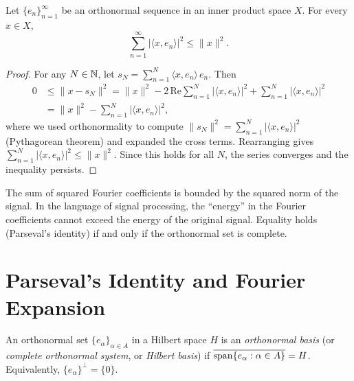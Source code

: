 \documentclass[11pt,a4paper]{article}
\begin{document}
\begin{theorem}
\label{thm:bessel}
Let $\{e_n\}_{n=1}^\infty$ be an orthonormal sequence in an inner
product space $X$. For every $x \in X$,
\[
    \sum_{n=1}^\infty |\langle x, e_n \rangle|^2 \leq \|x\|^2.
\]
\end{theorem}

\begin{proof}
For any $N \in \mathbb{N}$, let $s_N = \sum_{n=1}^N \langle x, e_n \rangle\, e_n$.
Then
\begin{align*}
    0 &\leq \|x - s_N\|^2
    = \|x\|^2 - 2\,\mathrm{Re}\sum_{n=1}^N
      |\langle x, e_n \rangle|^2 + \sum_{n=1}^N
      |\langle x, e_n \rangle|^2 \\
    &= \|x\|^2 - \sum_{n=1}^N |\langle x, e_n \rangle|^2,
\end{align*}
where we used orthonormality to compute
$\|s_N\|^2 = \sum_{n=1}^N |\langle x, e_n \rangle|^2$ (Pythagorean
theorem) and expanded the cross terms. Rearranging gives
$\sum_{n=1}^N |\langle x, e_n \rangle|^2 \leq \|x\|^2$. Since this
holds for all $N$, the series converges and the inequality persists.
\end{proof}

\begin{keyresult}[title={Bessel's Inequality -- Energy Bound}]
The sum of squared Fourier coefficients is bounded by the squared norm
of the signal. In the language of signal processing, the ``energy'' in
the Fourier coefficients cannot exceed the energy of the original
signal. Equality holds (Parseval's identity) if and only if the
orthonormal set is complete.
\end{keyresult}


\section{Parseval's Identity and Fourier Expansion}
\label{sec:parseval}

\begin{definition}
\label{def:onb}
An orthonormal set $\{e_\alpha\}_{\alpha \in A}$ in a Hilbert space $H$
is an \emph{orthonormal basis} (or \emph{complete orthonormal system},
or \emph{Hilbert basis}) if
$\overline{\operatorname{span}\{e_\alpha : \alpha \in A\}} = H$. Equivalently,
$\{e_\alpha\}^\perp = \{0\}$.
\end{definition}
\end{document}
